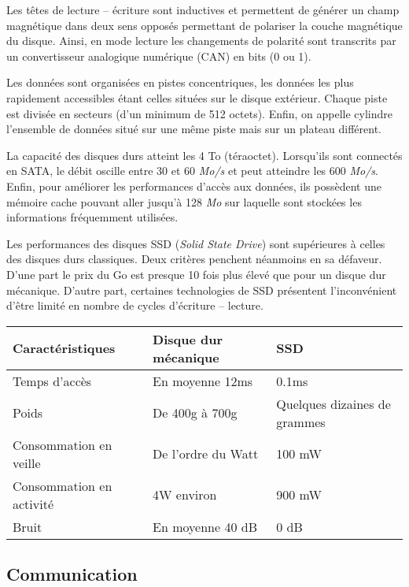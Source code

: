 Les têtes de lecture -- écriture sont inductives et permettent de générer un champ magnétique dans deux sens opposés permettant de polariser la couche magnétique du disque. Ainsi, en mode lecture les changements de polarité sont transcrits par un convertisseur analogique numérique (CAN) en bits (0 ou 1).

Les données sont organisées en pistes concentriques, les données les plus rapidement accessibles étant celles situées sur le disque extérieur. Chaque piste est divisée en secteurs (d'un minimum de 512 octets). Enfin, on appelle cylindre l'ensemble de données situé sur une même piste mais sur un plateau différent. 


La capacité des disques durs atteint les 4 To (téraoctet). Lorsqu'ils sont connectés en SATA, le débit oscille entre 30 et 60 \textit{Mo/s} et peut atteindre les 600 \textit{Mo/s}. Enfin, pour améliorer les performances d'accès aux données, ils possèdent une mémoire cache pouvant aller jusqu'à 128 \textit{Mo} sur laquelle sont stockées les informations fréquemment utilisées. 

Les performances des disques SSD (\textit{Solid State Drive}) sont supérieures à celles des disques durs classiques. Deux critères penchent néanmoins en sa défaveur. D'une part le prix du Go est presque 10 fois plus élevé 
que pour un disque dur mécanique. D'autre part, certaines technologies de SSD présentent l'inconvénient d'être limité en nombre de cycles d'écriture -- lecture.


\begin{center}
\begin{tabular}{|l|l|l|}
\hline
\textbf{Caractéristiques} & \textbf{Disque dur mécanique} & \textbf{SSD} \\ \hline
Temps d'accès & En moyenne 12ms & 0.1ms \\ \hline
Poids & De 400g à 700g & Quelques dizaines de grammes \\ \hline
Consommation en veille & De l'ordre du Watt & 100 mW \\ \hline
Consommation en activité & 4W environ & 900 mW \\ \hline
Bruit  & En moyenne 40 dB & 0 dB\\ \hline
\end{tabular}
\end{center}





\subsection{Communication}

